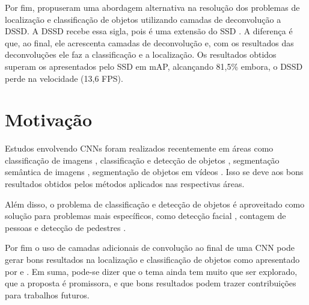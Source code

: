 Por fim,  propuseram uma abordagem alternativa na resolução dos problemas de localização e classificação de objetos utilizando camadas de deconvolução a \ac{DSSD}. A \ac{DSSD} recebe essa sigla, pois é uma extensão do \ac{SSD} \cite{wei-2015}. A diferença é que, ao final, ele acrescenta camadas de deconvolução e, com os resultados das deconvoluções ele faz a classificação e a localização. Os resultados obtidos superam os apresentados pelo \ac{SSD} em \ac{mAP}, alcançando 81,5\% embora, o  \ac{DSSD} perde na velocidade (13,6 FPS). 


\section{Motivação}
\label{secao:1:1}

Estudos envolvendo \ac{CNN}s foram realizados recentemente em áreas como classificação de imagens \cite{krizhevsky-2012, simonyan-2014}, classificação e detecção de objetos \cite{cheng-2017, lin-2014}, segmentação semântica de imagens \cite{long-2014, noh:2015}, segmentação de objetos em vídeos \cite{caelles-2017, voigtlaender-2017}. Isso se deve aos bons resultados obtidos pelos métodos aplicados nas respectivas áreas.

Além disso, o problema de classificação e detecção de objetos é aproveitado como solução para problemas mais específicos, como detecção facial \cite{yang-2018}, contagem de pessoas \cite{pren-2017} e detecção de pedestres \cite{lan-2018}. 

Por fim o uso de camadas adicionais de convolução ao final de uma \ac{CNN} pode gerar bons resultados na localização e classificação de objetos como apresentado por  e . Em suma, pode-se dizer que o tema ainda tem muito que ser explorado, que a proposta é promissora, e que bons resultados podem trazer contribuições para trabalhos futuros.


